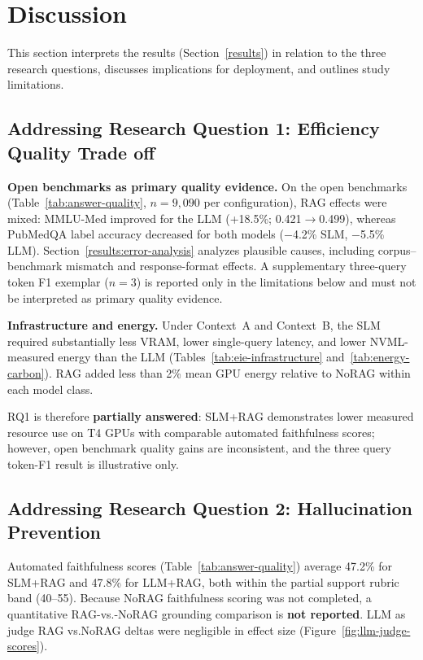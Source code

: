 \section{Discussion}
\label{discussion}

This section interprets the results (Section~\ref{results}) in relation to the three research questions, discusses implications for deployment, and outlines study limitations.

\subsection{Addressing Research Question 1: Efficiency Quality Trade off}

\textbf{Open benchmarks as primary quality evidence.}
On the open benchmarks (Table~\ref{tab:answer-quality}, $n{=}9{,}090$ per configuration), RAG effects were mixed: MMLU-Med improved for the LLM (+18.5\%; 0.421$\rightarrow$0.499), whereas PubMedQA label accuracy decreased for both models ($-$4.2\% SLM, $-$5.5\% LLM). Section~\ref{results:error-analysis} analyzes plausible causes, including corpus--benchmark mismatch and response-format effects. A supplementary three-query token F1 exemplar ($n{=}3$) is reported only in the limitations below and must not be interpreted as primary quality evidence.

\textbf{Infrastructure and energy.}
Under Context~A and Context~B, the SLM required substantially less VRAM, lower single-query latency, and lower NVML-measured energy than the LLM (Tables~\ref{tab:eie-infrastructure} and~\ref{tab:energy-carbon}). RAG added less than 2\% mean GPU energy relative to NoRAG within each model class.

RQ1 is therefore \textbf{partially answered}: SLM+RAG demonstrates lower measured resource use on T4 GPUs with comparable automated faithfulness scores; however, open benchmark quality gains are inconsistent, and the three query token-F1 result is illustrative only.

\subsection{Addressing Research Question 2: Hallucination Prevention}

Automated faithfulness scores (Table~\ref{tab:answer-quality}) average 47.2\% for SLM+RAG and 47.8\% for LLM+RAG, both within the partial support rubric band (40--55). Because NoRAG faithfulness scoring was not completed, a quantitative RAG-vs.-NoRAG grounding comparison is \textbf{not reported}. LLM as judge RAG vs.NoRAG deltas were negligible in effect size (Figure~\ref{fig:llm-judge-scores}).

